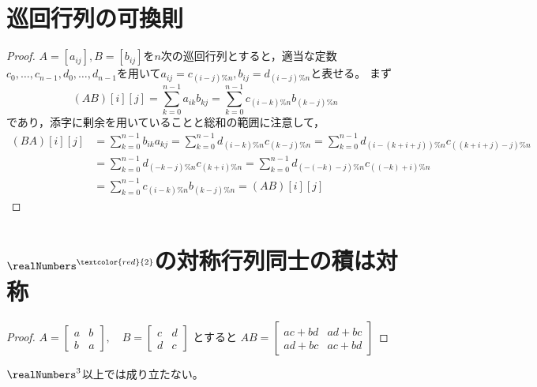    \section{巡回行列の可換則}
        \begin{proof}
            $A=[a_{ij}],B=[b_{ij}]$を$n$次の巡回行列とすると，適当な定数$c_0,\dotsc,c_{n-1},d_0,\dotsc,d_{n-1}$を用いて$a_{ij} = c_{(i-j)\%n},b_{ij} = d_{(i-j)\%n}$と表せる。
            まず
            \[ (AB)[i][j] = \sum_{k=0}^{n-1} a_{ik}b_{kj} = \sum_{k=0}^{n-1} c_{(i-k)\%n}b_{(k-j)\%n} \]
            であり，添字に剰余を用いていることと総和の範囲に注意して，
            \begin{align*}
                (BA)[i][j] &= \sum_{k=0}^{n-1} b_{ik}a_{kj} = \sum_{k=0}^{n-1} d_{(i-k)\%n}c_{(k-j)\%n} = \sum_{k=0}^{n-1} d_{(i-(k+i+j))\%n}c_{((k+i+j)-j)\%n} \\
                &= \sum_{k=0}^{n-1} d_{(-k-j)\%n}c_{(k+i)\%n} = \sum_{k=0}^{n-1} d_{(-(-k)-j)\%n}c_{((-k)+i)\%n} \\
                &= \sum_{k=0}^{n-1} c_{(i-k)\%n}b_{(k-j)\%n} = (AB)[i][j]
            \end{align*}
        \end{proof}
    \section{\texorpdfstring{$\realNumbers^{\textcolor{red}{2}}$}{R\string^2}の対称行列同士の積は対称}
        \begin{proof}
            $
                A = \begin{bmatrix}
                    a & b \\
                    b & a
                \end{bmatrix},\quad
                B = \begin{bmatrix}
                    c & d \\
                    d & c
                \end{bmatrix}
            $
            とすると
            $
                AB = \begin{bmatrix}
                    ac + bd & ad + bc \\
                    ad + bc & ac + bd
                \end{bmatrix}
            $
        \end{proof}
        \begin{attention}
            $\realNumbers^3$以上では成り立たない。
        \end{attention}
